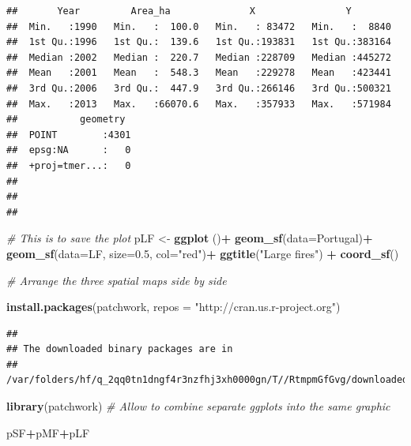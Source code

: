 \documentclass[
]{book}
\newenvironment{Shaded}{\begin{snugshade}}{\end{snugshade}}
\newcommand{\AttributeTok}[1]{\textcolor[rgb]{0.13,0.29,0.53}{#1}}
\newcommand{\CommentTok}[1]{\textcolor[rgb]{0.56,0.35,0.01}{\textit{#1}}}
\newcommand{\FloatTok}[1]{\textcolor[rgb]{0.00,0.00,0.81}{#1}}
\newcommand{\FunctionTok}[1]{\textcolor[rgb]{0.13,0.29,0.53}{\textbf{#1}}}
\newcommand{\NormalTok}[1]{#1}
\newcommand{\OtherTok}[1]{\textcolor[rgb]{0.56,0.35,0.01}{#1}}
\newcommand{\SpecialCharTok}[1]{\textcolor[rgb]{0.81,0.36,0.00}{\textbf{#1}}}
\newcommand{\StringTok}[1]{\textcolor[rgb]{0.31,0.60,0.02}{#1}}
\begin{document}
\begin{verbatim}
##       Year         Area_ha              X                Y         
##  Min.   :1990   Min.   :  100.0   Min.   : 83472   Min.   :  8840  
##  1st Qu.:1996   1st Qu.:  139.6   1st Qu.:193831   1st Qu.:383164  
##  Median :2002   Median :  220.7   Median :228709   Median :445272  
##  Mean   :2001   Mean   :  548.3   Mean   :229278   Mean   :423441  
##  3rd Qu.:2006   3rd Qu.:  447.9   3rd Qu.:266146   3rd Qu.:500321  
##  Max.   :2013   Max.   :66070.6   Max.   :357933   Max.   :571984  
##           geometry   
##  POINT        :4301  
##  epsg:NA      :   0  
##  +proj=tmer...:   0  
##                      
##                      
## 
\end{verbatim}

\begin{Shaded}
\begin{Highlighting}[]
\CommentTok{\# This is to save the plot }
\NormalTok{pLF }\OtherTok{\textless{}{-}} \FunctionTok{ggplot}\NormalTok{ ()}\SpecialCharTok{+}
  \FunctionTok{geom\_sf}\NormalTok{(}\AttributeTok{data=}\NormalTok{Portugal)}\SpecialCharTok{+}
  \FunctionTok{geom\_sf}\NormalTok{(}\AttributeTok{data=}\NormalTok{LF, }\AttributeTok{size=}\FloatTok{0.5}\NormalTok{, }\AttributeTok{col=}\StringTok{"red"}\NormalTok{)}\SpecialCharTok{+}
 \FunctionTok{ggtitle}\NormalTok{(}\StringTok{"Large fires"}\NormalTok{) }\SpecialCharTok{+}
 \FunctionTok{coord\_sf}\NormalTok{()}
\end{Highlighting}
\end{Shaded}

\begin{Shaded}
\begin{Highlighting}[]
\CommentTok{\# Arrange the three spatial maps side by side}

\FunctionTok{install.packages}\NormalTok{(}\StringTok{\textquotesingle{}patchwork\textquotesingle{}}\NormalTok{, }\AttributeTok{repos =} \StringTok{"http://cran.us.r{-}project.org"}\NormalTok{) }
\end{Highlighting}
\end{Shaded}

\begin{verbatim}
## 
## The downloaded binary packages are in
##  /var/folders/hf/q_2qq0tn1dngf4r3nzfhj3xh0000gn/T//RtmpmGfGvg/downloaded_packages
\end{verbatim}

\begin{Shaded}
\begin{Highlighting}[]
\FunctionTok{library}\NormalTok{(patchwork) }\CommentTok{\# Allow to  combine separate ggplots into the same graphic}

\NormalTok{pSF}\SpecialCharTok{+}\NormalTok{pMF}\SpecialCharTok{+}\NormalTok{pLF}
\end{Highlighting}
\end{Shaded}
\end{document}
